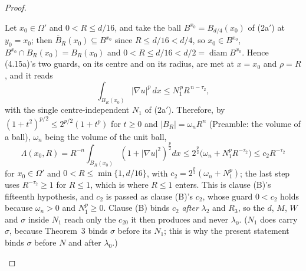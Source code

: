 \begin{proof}
\begin{enumerate}
  Let $x_0\in\Omega'$ and $0<R\le d/16$, and take
  the ball $B^{x_0}=B_{d/4}(x_0)$ of (2a$'$) at $y_0=x_0$; then
  $\overline B_R(x_0)\subseteq B^{x_0}$ since $R\le d/16<d/4$, so
  $x_0\in B^{x_0}$, $B^{x_0}\cap B_R(x_0)=B_R(x_0)$ and
  $0<R\le d/16<d/2=\operatorname{diam}B^{x_0}$.  Hence (4.15a)'s two guards, on its
  centre and on its radius, are met at $x=x_0$ and $\rho=R$, and it reads
  \[
  \int_{B_R(x_0)}|\nabla u|^p\,dx\le N_1^{\,p}R^{\,n-\tau_2} ,
  \]
  with the single centre-independent $N_1$ of (2a$'$).  Therefore, by
  $(1+t^2)^{p/2}\le2^{p/2}(1+t^p)$ for $t\ge0$ and $|B_R|=\omega_nR^n$
  (Preamble: the volume of a ball), $\omega_n$ being the volume of the unit
  ball,
  \[
  \Lambda(x_0,R)=R^{-n}\!\int_{B_R(x_0)}(1+|\nabla u|^2)^{\frac p2}dx
  \le2^{\frac p2}\bigl(\omega_n+N_1^pR^{-\tau_2}\bigr)\le c_2R^{-\tau_2}
  \]
  for $x_0\in\Omega'$ and $0<R\le\min\{1,d/16\}$, with
  $c_2=2^{\frac p2}(\omega_n+N_1^p)$; the last step uses $R^{-\tau_2}\ge1$ for
  $R\le1$, which is where $R\le1$ enters.  This
  is clause (B)'s fifteenth hypothesis, and $c_2$ is passed as clause (B)'s
  $c_2$, whose guard $0<c_2$ holds because $\omega_n>0$ and $N_1^p\ge0$.  Clause
  (B) binds $c_2$ \emph{after} $\lambda_2$ and $R_3$, so the $d$, $M$, $W$ and
  $\sigma$ inside $N_1$ reach only the $c_{20}$ it then produces and never
  $\lambda_0$.  ($N_1$ does
  carry $\sigma$, because Theorem~3 binds $\sigma$ before its $N_1$; this is why
  the present statement binds $\sigma$ before $N$ and after $\lambda_0$.)


\end{enumerate}
\end{proof}
